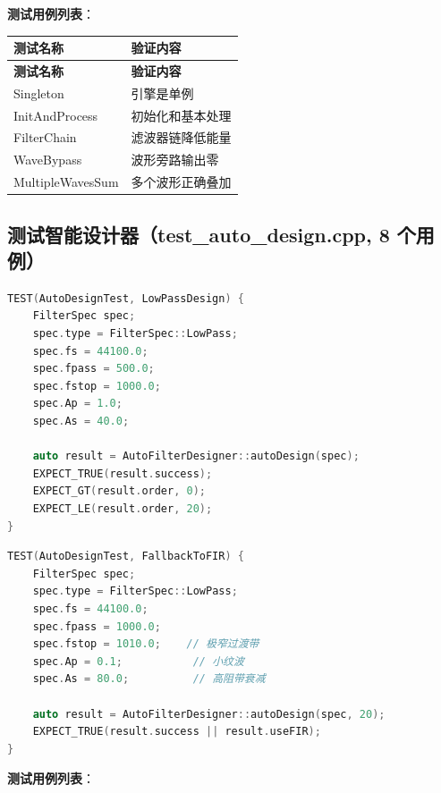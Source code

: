 ﻿\documentclass[12pt,a4paper,oneside]{ctexbook}
\begin{document}
\textbf{测试用例列表}：

\begin{longtable}{p{4cm}p{9cm}}
    \toprule
    \textbf{测试名称} & \textbf{验证内容} \\
    \midrule
    \endfirsthead
    \toprule
    \textbf{测试名称} & \textbf{验证内容} \\
    \midrule
    \endhead
    \bottomrule
    \endfoot
    Singleton & 引擎是单例 \\
    InitAndProcess & 初始化和基本处理 \\
    FilterChain & 滤波器链降低能量 \\
    WaveBypass & 波形旁路输出零 \\
    MultipleWavesSum & 多个波形正确叠加 \\
    \bottomrule
\end{longtable}

\subsection{测试智能设计器（test\_auto\_design.cpp, 8 个用例）}

\begin{lstlisting}[language=C++, caption={智能设计测试}]
TEST(AutoDesignTest, LowPassDesign) {
    FilterSpec spec;
    spec.type = FilterSpec::LowPass;
    spec.fs = 44100.0;
    spec.fpass = 500.0;
    spec.fstop = 1000.0;
    spec.Ap = 1.0;
    spec.As = 40.0;

    auto result = AutoFilterDesigner::autoDesign(spec);
    EXPECT_TRUE(result.success);
    EXPECT_GT(result.order, 0);
    EXPECT_LE(result.order, 20);
}
\end{lstlisting}

\begin{lstlisting}[language=C++, caption={回退到 FIR 测试}]
TEST(AutoDesignTest, FallbackToFIR) {
    FilterSpec spec;
    spec.type = FilterSpec::LowPass;
    spec.fs = 44100.0;
    spec.fpass = 1000.0;
    spec.fstop = 1010.0;    // 极窄过渡带
    spec.Ap = 0.1;           // 小纹波
    spec.As = 80.0;          // 高阻带衰减

    auto result = AutoFilterDesigner::autoDesign(spec, 20);
    EXPECT_TRUE(result.success || result.useFIR);
}
\end{lstlisting}

\textbf{测试用例列表}：
\end{document}
